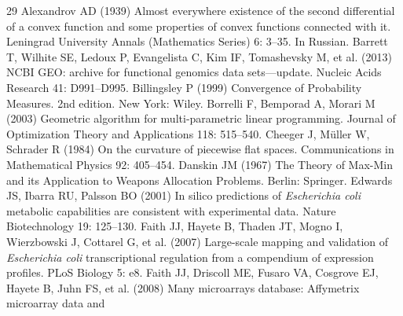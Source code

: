 \begin{thebibliography}{29}
\setlength{\itemsep}{2pt}
\small
{}
Alexandrov AD (1939) Almost everywhere existence of the second differential of a
             convex function and some properties of convex functions
             connected with it. Leningrad University Annals (Mathematics Series) 6: 3--35. In Russian.
Barrett T, Wilhite SE, Ledoux P, Evangelista C, Kim IF, Tomashevsky M, et al. (2013) {NCBI GEO}: archive for functional genomics data sets---update. Nucleic Acids Research 41: D991--D995.
Billingsley P (1999) Convergence of Probability Measures. 2nd edition. New York: Wiley.
Borrelli F, Bemporad A, Morari M (2003) Geometric algorithm for multi-parametric linear
             programming. Journal of Optimization Theory and Applications 118: 515--540.
Cheeger J, M{\"u}ller W, Schrader R (1984) On the curvature of piecewise flat spaces. Communications in Mathematical Physics 92: 405--454.
Danskin JM (1967) The Theory of Max-Min and its Application to Weapons
               Allocation Problems. Berlin: Springer.
Edwards JS, Ibarra RU, Palsson BO (2001) In silico predictions of \emph{Escherichia coli} metabolic
             capabilities are consistent with experimental data. Nature Biotechnology 19: 125--130.
Faith JJ, Hayete B, Thaden JT, Mogno I, Wierzbowski J, Cottarel G, et al. (2007) Large-scale mapping and validation of \emph{Escherichia coli}
             transcriptional regulation from a compendium of expression
             profiles. PLoS Biology 5: e8.
Faith JJ, Driscoll ME, Fusaro VA, Cosgrove EJ, Hayete B, Juhn FS, et al. (2008) Many microarrays database: Affymetrix microarray data and

\end{thebibliography}
